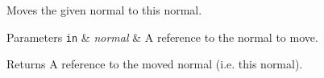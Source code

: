 Moves the given normal to this normal.


\begin{DoxyParams}[1]{Parameters}
\mbox{\tt in}  & {\em normal} & A reference to the normal to move. \\
\hline
\end{DoxyParams}
\begin{DoxyReturn}{Returns}
A reference to the moved normal (i.\+e. this normal). 
\end{DoxyReturn}
